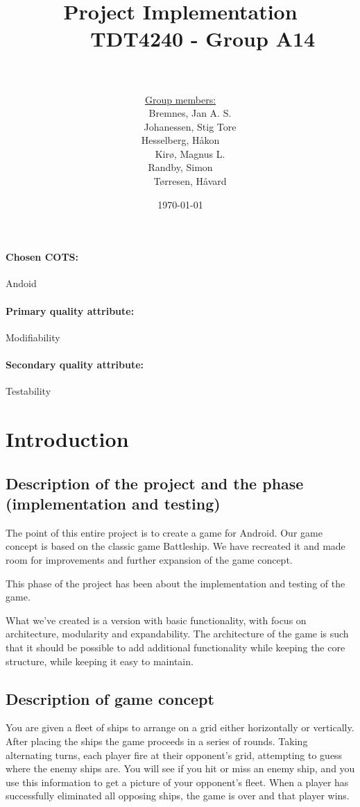 \documentclass[12pt, a4paper]{article}
\title{
	Project Implementation \\
    TDT4240 - Group A14 \\
	\\
}
\author{
	\underline{Group members:} \\
    Bremnes, Jan A. S.\\
    Johanessen, Stig Tore\\
	Hesselberg, Håkon \\
    Kirø, Magnus L.\\
	Randby, Simon \\
    Tørresen, Håvard\\
}
\date{\today}
\begin{document}
\maketitle
\paragraph{Chosen COTS:} Andoid
\paragraph{Primary quality attribute:} Modifiability
\paragraph{Secondary quality attribute:} Testability \\


\newpage
\tableofcontents
\newpage

\section{Introduction}

\subsection{Description of the project and the phase (implementation and
testing)}

The point of this entire project is to create a game for Android. Our game
concept is based on the classic game Battleship. We have recreated it and made
room for improvements and further expansion of the game concept. 

This phase of the project has been about the implementation and testing of the
game.

What we’ve created is a version with basic functionality, with focus on
architecture, modularity and expandability. The architecture of the game is such
that it should be possible to add additional functionality while keeping the
core structure, while keeping it easy to maintain.

\subsection{Description of game concept}
You are given a fleet of ships to arrange on a grid either horizontally or
vertically. After placing the ships the game proceeds in a series of rounds.
Taking alternating turns, each player fire at their opponent’s grid, attempting
to guess where the enemy ships are. You will see if you hit or miss an enemy
ship, and you use this information to get a picture of your opponent’s fleet.
When a player has successfully eliminated all opposing ships, the game is over
and that player wins.
\end{document}
